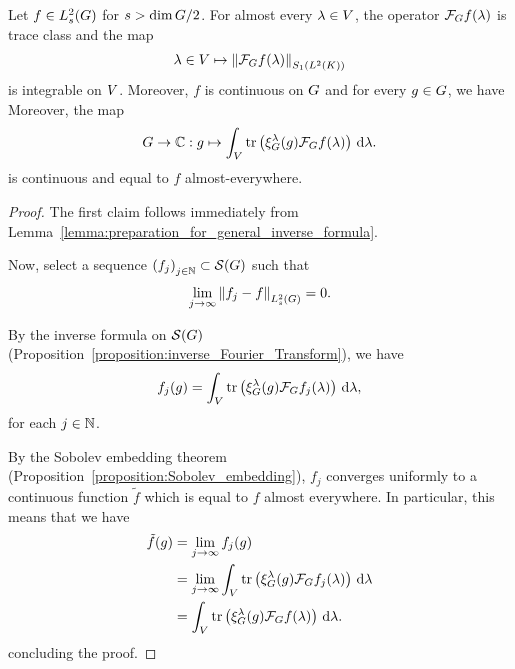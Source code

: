 \begin{proposition}
    Let $f \in \Sobolev s$ for $s > \dim \Group / 2$.
    For almost every $\lambda \in \VectorSpace$,
    the operator $\Fourier f(\lambda)$ is trace class and the map
    \begin{align*}
        \lambda \in \VectorSpace \mapsto \norm [\SchattenClasses 1 {\Lebesgue 2 \CompactGroup}] {\Fourier f(\lambda)}
    \end{align*}
    is integrable on $\VectorSpace$.
    Moreover, $f$ is continuous on $\Group$ and for every $g \in \Group$, we have
    Moreover, the map
    \begin{align*}
        \Group \to \C : g \mapsto \int_\VectorSpace \tr\left(\Rep \lambda (g) \Fourier f(\lambda)\right) \dd \lambda.
    \end{align*}
    is continuous and equal to $f$ almost-everywhere.
\end{proposition}
\begin{proof}
    The first claim follows immediately from Lemma~\ref{lemma:preparation_for_general_inverse_formula}.

    Now, select a sequence ${(f_j)}_{j \in \N} \subset \Schwartz \Group$ such that
    \begin{align*}
        \lim_{j \to \infty} \norm [\Sobolev s] {f_j - f} = 0.
    \end{align*}

    By the inverse formula on $\Schwartz \Group$ (Proposition~\ref{proposition:inverse_Fourier_Transform}),
    we have
    \begin{align*}
        f_j(g)
        = \int_\VectorSpace \tr\left(\Rep \lambda(g) \Fourier f_j(\lambda)\right) \dd \lambda,
    \end{align*}
    for each $j \in \N$.

    By the Sobolev embedding theorem (Proposition~\ref{proposition:Sobolev_embedding}),
    $f_j$ converges uniformly to a continuous function $\tilde f$ which is equal to $f$ almost everywhere.
    In particular, this means that we have
    \begin{align*}
        \tilde f(g)
        &= \lim_{j \to \infty} f_j(g)\\
        &= \lim_{j \to \infty} \int_\VectorSpace \tr\left(\Rep \lambda(g) \Fourier f_j(\lambda)\right) \dd \lambda\\
        &= \int_\VectorSpace \tr\left(\Rep \lambda(g) \Fourier f(\lambda)\right) \dd \lambda.
    \end{align*}
    concluding the proof.
\end{proof}

